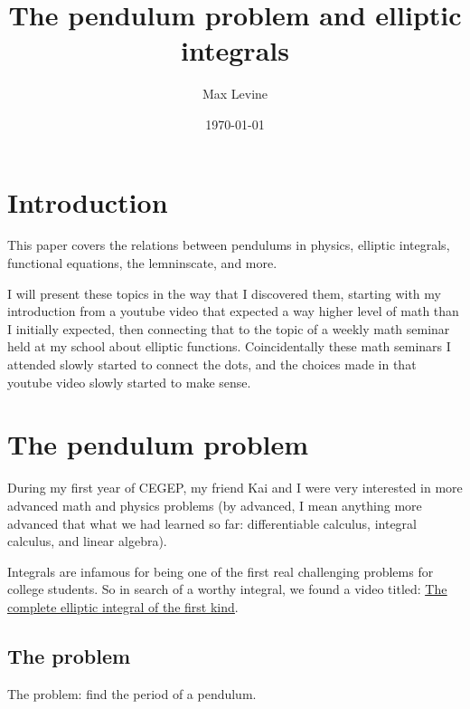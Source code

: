 \documentclass[11pt]{article}
\title{The pendulum problem and elliptic integrals}
\author{Max Levine}
\date{\today}
\begin{document}
\maketitle
\tableofcontents

\section{Introduction}
This paper covers the relations between pendulums in physics, elliptic integrals, functional equations, the lemninscate, and more.

\vspace{5mm} I will present these topics in the way that I discovered them, starting with my introduction from a youtube video that expected a way higher level of math than I initially expected, then connecting that to the topic of a weekly math seminar held at my school about elliptic functions. Coincidentally these math seminars I attended slowly started to connect the dots, and the choices made in that youtube video slowly started to make sense.

\section{The pendulum problem}
During my first year of CEGEP, my friend Kai and I were very interested in more advanced math and physics problems (by advanced, I mean anything more advanced that what we had learned so far: differentiable calculus, integral calculus, and linear algebra). 

\vspace{5mm}Integrals are infamous for being one of the first real challenging problems for college students. So in search of a worthy integral, we found a video titled: \underline{\href{https://www.youtube.com/watch?v=h19xcTPzlEc}{The complete elliptic integral of the first kind}}.

\subsection{The problem}
The problem: find the period of a pendulum.
\end{document}
